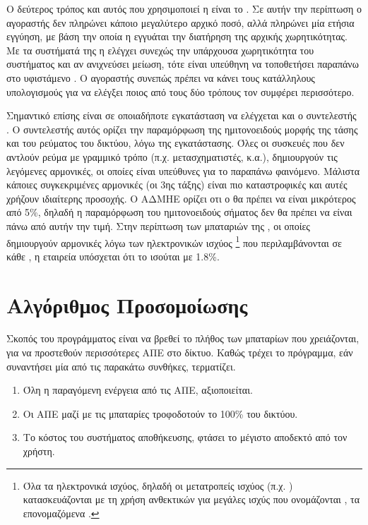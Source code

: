 \documentclass[12pt]{report}
\begin{document}
Ο δεύτερος τρόπος και αυτός που χρησιμοποιεί η {} είναι το {}. Σε αυτήν την περίπτωση ο αγοραστής δεν πληρώνει κάποιο μεγαλύτερο αρχικό ποσό, αλλά
πληρώνει μία ετήσια εγγύηση, με βάση την οποία η {} εγγυάται την διατήρηση της αρχικής χωρητικότητας. Με τα συστήματά της η {} ελέγχει συνεχώς την υπάρχουσα χωρητικότητα του συστήματος
και αν ανιχνεύσει μείωση, τότε είναι υπεύθηνη να τοποθετήσει παραπάνω {} στο υφιστάμενο {}. Ο αγοραστής συνεπώς πρέπει να κάνει τους κατάλληλους υπολογισμούς για να ελέγξει 
ποιος από τους δύο τρόπους τον συμφέρει περισσότερο.

Σημαντικό επίσης είναι σε οποιαδήποτε εγκατάσταση να ελέγχεται και ο συντελεστής {}. Ο συντελεστής αυτός ορίζει την παραμόρφωση της ημιτονοειδούς μορφής της τάσης και του ρεύματος του
δικτύου, λόγω της εγκατάστασης. Όλες οι συσκευές που δεν αντλούν ρεύμα με γραμμικό τρόπο (π.χ. μετασχηματιστές, {} κ.α.), δημιουργούν τις λεγόμενες αρμονικές, οι οποίες είναι υπεύθυνες για το παραπάνω
φαινόμενο. Μάλιστα κάποιες συγκεκριμένες αρμονικές (οι 3ης τάξης) είναι πιο καταστροφικές και αυτές χρήζουν ιδιαίτερης προσοχής. Ο ΑΔΜΗΕ ορίζει οτι ο {} θα πρέπει να είναι μικρότερος από 5\%, δηλαδή η παραμόρφωση
του ημιτονοειδούς σήματος δεν θα πρέπει να είναι πάνω από αυτήν την τιμή. Στην περίπτωση των μπαταριών της {}, οι οποίες δημιουργούν αρμονικές λόγω των ηλεκτρονικών ισχύος
\footnote{Όλα τα ηλεκτρονικά ισχύος, δηλαδή οι μετατροπείς ισχύος (π.χ. {}) κατασκευάζονται με τη χρήση ανθεκτικών για μεγάλες ισχύς {} που ονομάζονται {}, 
τα επονομαζόμενα {}.} που περιλαμβάνονται σε κάθε {}, η εταιρεία υπόσχεται ότι το {} ισούται με 1.8\%.

\chapter{Αλγόριθμος Προσομοίωσης}
Σκοπός του προγράμματος είναι να βρεθεί το πλήθος των μπαταρίων που χρειάζονται, για να προστεθούν περισσότερες ΑΠΕ στο δίκτυο. Καθώς τρέχει το πρόγραμμα, εάν συναντήσει μία από τις παρακάτω συνθήκες, τερματίζει.

\begin{enumerate}[label=\roman*.]
				\item Όλη η παραγόμενη ενέργεια από τις ΑΠΕ, αξιοποιείται.
				\item Οι ΑΠΕ μαζί με τις μπαταρίες τροφοδοτούν το 100\% του δικτύου.
				\item Το κόστος του συστήματος αποθήκευσης, φτάσει το μέγιστο αποδεκτό από τον χρήστη.
\end{enumerate}
\end{document}
